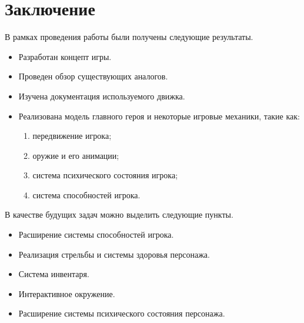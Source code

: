 
\section*{Заключение}
В рамках проведения работы были получены следующие результаты.

\begin{itemize}
\item Разработан концепт игры.
\item Проведен обзор существующих аналогов.
\item Изучена документация используемого движка.
\item Реализована модель главного героя и некоторые игровые механики, такие как:
    \begin{enumerate}
       \item  передвижение игрока;
       \item  оружие и его анимации;
       \item  система психического состояния игрока;
       \item  система способностей игрока.
    \end{enumerate}   
\end{itemize}
\noindent В качестве будущих задач можно выделить следующие пункты.
\begin{itemize}
\item Расширение системы способностей игрока.
\item Реализация стрельбы и системы здоровья персонажа.
\item Система инвентаря.
\item Интерактивное окружение.
\item Расширение системы психического состояния персонажа.
\end{itemize}

